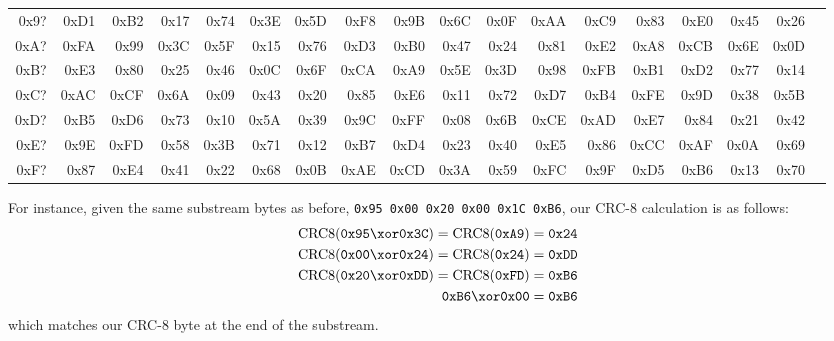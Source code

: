 \begin{table}[h]
{\begin{tabular}{|r||r|r|r|r|r|r|r|r|r|r|r|r|r|r|r|r|r|}
0x9? & 0xD1 & 0xB2 & 0x17 & 0x74 & 0x3E & 0x5D & 0xF8 & 0x9B & 0x6C & 0x0F & 0xAA & 0xC9 & 0x83 & 0xE0 & 0x45 & 0x26 \\
0xA? & 0xFA & 0x99 & 0x3C & 0x5F & 0x15 & 0x76 & 0xD3 & 0xB0 & 0x47 & 0x24 & 0x81 & 0xE2 & 0xA8 & 0xCB & 0x6E & 0x0D \\
0xB? & 0xE3 & 0x80 & 0x25 & 0x46 & 0x0C & 0x6F & 0xCA & 0xA9 & 0x5E & 0x3D & 0x98 & 0xFB & 0xB1 & 0xD2 & 0x77 & 0x14 \\
0xC? & 0xAC & 0xCF & 0x6A & 0x09 & 0x43 & 0x20 & 0x85 & 0xE6 & 0x11 & 0x72 & 0xD7 & 0xB4 & 0xFE & 0x9D & 0x38 & 0x5B \\
0xD? & 0xB5 & 0xD6 & 0x73 & 0x10 & 0x5A & 0x39 & 0x9C & 0xFF & 0x08 & 0x6B & 0xCE & 0xAD & 0xE7 & 0x84 & 0x21 & 0x42 \\
0xE? & 0x9E & 0xFD & 0x58 & 0x3B & 0x71 & 0x12 & 0xB7 & 0xD4 & 0x23 & 0x40 & 0xE5 & 0x86 & 0xCC & 0xAF & 0x0A & 0x69 \\
0xF? & 0x87 & 0xE4 & 0x41 & 0x22 & 0x68 & 0x0B & 0xAE & 0xCD & 0x3A & 0x59 & 0xFC & 0x9F & 0xD5 & 0xB6 & 0x13 & 0x70 \\
\hline
\end{tabular}
}
\end{table}

For instance, given the same substream bytes as before,
\texttt{0x95 0x00 0x20 0x00 0x1C 0xB6},
our CRC-8 calculation is as follows:
\begin{align*}
\text{CRC8}(\texttt{0x95} \xor \texttt{0x3C}) = \text{CRC8}(\texttt{0xA9}) &= \texttt{0x24} \\
\text{CRC8}(\texttt{0x00} \xor \texttt{0x24}) = \text{CRC8}(\texttt{0x24}) &= \texttt{0xDD} \\
\text{CRC8}(\texttt{0x20} \xor \texttt{0xDD}) = \text{CRC8}(\texttt{0xFD}) &= \texttt{0xB6} \\
\texttt{0xB6} \xor \texttt{0x00} &= \texttt{0xB6}
\end{align*}
which matches our CRC-8 byte at the end of the substream.

\clearpage
